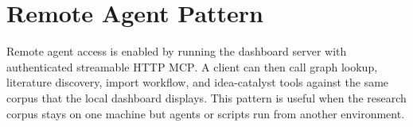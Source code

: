 \documentclass[11pt]{article}
\newcommand{\mcp}{\textsc{MCP}}
\begin{document}
\section{Remote Agent Pattern}

Remote agent access is enabled by running the dashboard server with authenticated streamable HTTP \mcp{}. A client can then call graph lookup, literature discovery, import workflow, and idea-catalyst tools against the same corpus that the local dashboard displays. This pattern is useful when the research corpus stays on one machine but agents or scripts run from another environment.
\end{document}
